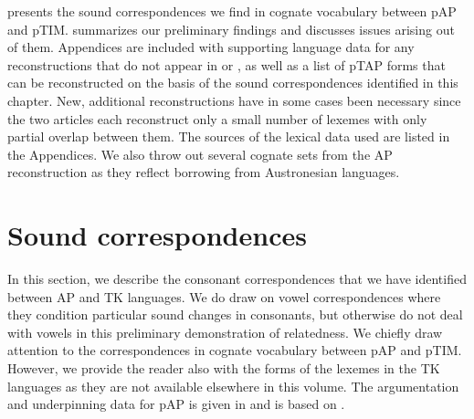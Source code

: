  presents the sound correspondences we find in cognate vocabulary between pAP and pTIM.  summarizes our preliminary findings and discusses issues arising out of them.  Appendices are included with supporting language data for any reconstructions that do not appear in \citet{HoltonEtAl2012} or \citet{SchapperEtAl2012}, as well as a list of pTAP forms that can be reconstructed on the basis of the sound correspondences identified in this chapter. New, additional reconstructions have in some cases been necessary since the two articles each reconstruct only a small number of lexemes with only partial overlap between them.  The sources of the lexical data used are listed in the Appendices. We also throw out several cognate sets from the AP reconstruction as they reflect borrowing from Austronesian languages. 

\section{Sound correspondences}\label{sec:3:2}
In this section, we describe the consonant correspondences that we have identified between AP and TK languages. We do draw on vowel correspondences where they condition particular sound changes in consonants, but otherwise do not deal with vowels in this preliminary demonstration of relatedness. We chiefly draw attention to the correspondences in cognate vocabulary between pAP and pTIM. However, we provide the reader also with the forms of the lexemes in the TK languages as they are not available elsewhere in this volume. The argumentation and underpinning data for pAP is given in \citet{HoltonRobinsonTVhistory} and is based on \citet{HoltonEtAl2012}.

